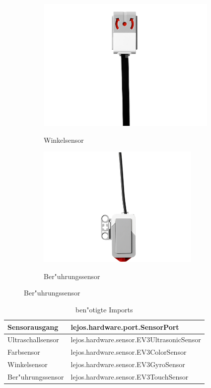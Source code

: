 \begin{figure}[hptb]
\begin{subfigure}{.225\textwidth}
		\includegraphics[width=\textwidth]{images/gyro.png}
		\\
		\caption{Winkelsensor}
		\label{fig:g2}
	\end{subfigure}
	\hfill
	\begin{subfigure}{.225\textwidth}
		\includegraphics[width=\textwidth]{images/touch.png}
		\\
		\caption{Ber"uhrungssensor}
		\label{fig:g2}
	\end{subfigure}
\end{figure}

\begin{table}[h]
	\begin{tabular}{|p{}| p{}|}
		\hline
		Sensorausgang & lejos.hardware.port.SensorPort\\ \hline
		Ultraschallsensor& lejos.hardware.sensor.EV3UltrasonicSensor
		\\ \hline 
		Farbsensor & lejos.hardware.sensor.EV3ColorSensor\\ \hline 
		Winkelsensor & lejos.hardware.sensor.EV3GyroSensor\\ \hline 
		Ber"uhrungssensor & lejos.hardware.sensor.EV3TouchSensor\\ \hline 
	\end{tabular}
	\caption{ben"otigte Imports}
\end{table}


